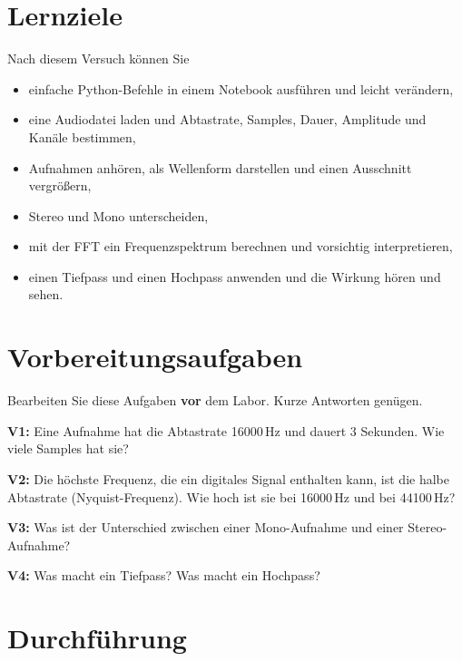 \documentclass[11pt]{article}
\begin{document}
\section{Lernziele}

Nach diesem Versuch können Sie
\begin{itemize}
  \item einfache Python-Befehle in einem Notebook ausführen und leicht verändern,
  \item eine Audiodatei laden und Abtastrate, Samples, Dauer, Amplitude und Kanäle bestimmen,
  \item Aufnahmen anhören, als Wellenform darstellen und einen Ausschnitt vergrößern,
  \item Stereo und Mono unterscheiden,
  \item mit der FFT ein Frequenzspektrum berechnen und vorsichtig interpretieren,
  \item einen Tiefpass und einen Hochpass anwenden und die Wirkung hören und sehen.
\end{itemize}

\bigskip
\section{Vorbereitungsaufgaben}

Bearbeiten Sie diese Aufgaben \textbf{vor} dem Labor. Kurze Antworten genügen.

\begin{block}
\textbf{V1:} Eine Aufnahme hat die Abtastrate 16000\,Hz und dauert 3 Sekunden. Wie viele Samples hat sie?
\end{block}
\begin{block}
\textbf{V2:} Die höchste Frequenz, die ein digitales Signal enthalten kann, ist die halbe Abtastrate (Nyquist-Frequenz). Wie hoch ist sie bei 16000\,Hz und bei 44100\,Hz?
\end{block}
\begin{block}
\textbf{V3:} Was ist der Unterschied zwischen einer Mono-Aufnahme und einer Stereo-Aufnahme?
\end{block}
\begin{block}
\textbf{V4:} Was macht ein Tiefpass? Was macht ein Hochpass?
\end{block}

\bigskip
\section{Durchführung}
\end{document}
